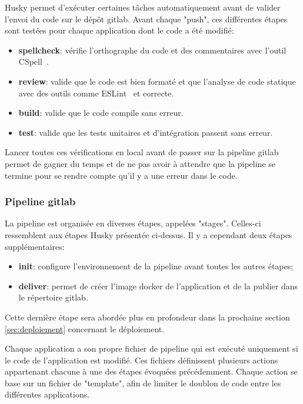 Husky permet d'exécuter certaines tâches automatiquement avant de valider l'envoi du code sur le dépôt \gls{gitlab}. Avant chaque "push", ces différentes étapes sont testées pour chaque application dont le code a été modifié:

\begin{itemize}
  \item \textbf{spellcheck}: vérifie l'orthographe du code et des commentaires avec l'outil CSpell~\cite{cspell}.
  \item \textbf{review}: valide que le code est bien formaté et que l'analyse de code statique avec des outils comme ESLint~\cite{eslint} et correcte.
  \item \textbf{build}: valide que le code compile sans erreur.
  \item \textbf{test}: valide que les tests unitaires et d'intégration passent sans erreur.
\end{itemize}

Lancer toutes ces vérifications en local avant de passer sur la pipeline \gls{gitlab} permet de gagner du temps et de ne pas avoir à attendre que la pipeline se termine pour se rendre compte qu'il y a une erreur dans le code.

\subsubsection{Pipeline \gls{gitlab}}

La pipeline est organisée en diverses étapes, appelées "stages". Celles-ci ressemblent aux étapes Husky présentée ci-dessus. Il y a cependant deux étapes supplémentaires:

\begin{itemize}
  \item \textbf{init}: configure l'environnement de la pipeline avant toutes les autres étapes;
  \item \textbf{deliver}: permet de créer l'image \gls{docker} de l'application et de la publier dans le répertoire \gls{gitlab}.
\end{itemize}

Cette dernière étape sera abordée plus en profondeur dans la prochaine section \ref{sec:deploiement} concernant le déploiement.

Chaque application a son propre fichier de pipeline qui est exécuté uniquement si le code de l'application est modifié. Ces fichiers définissent plusieurs actions appartenant chacune à une des étapes évoquées précédemment. Chaque action se base sur un fichier de "template", afin de limiter le doublon de code entre les différentes applications.

